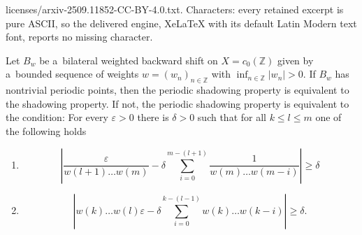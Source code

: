 \documentclass[10pt,a4paper]{amsart}
\newcommand{\Z}{\mathbb{Z}}
\newcommand{\abs}[1]{\left| #1 \right|}
\newcommand{\eps}{\varepsilon}
\begin{document}
licenses/arxiv-2509.11852-CC-BY-4.0.txt. Characters: every retained excerpt is pure ASCII, so the delivered engine, XeLaTeX with its default Latin Modern text font, reports no missing character.
	\begin{theorem} \label{thm:PSPc0}
		Let $B_w$ be a~bilateral weighted backward shift on \(X = c_0(\Z)\) given by a~bounded sequence of weights \(w = (w_n)_{n \in \Z}\) with \(\inf_{n \in \Z}\abs{w_n} > 0\). If $B_w$ has nontrivial periodic points, then the periodic shadowing property is equivalent to the shadowing property. If not, the periodic shadowing property is equivalent to the condition:
		For every $\eps > 0$ there is $\delta > 0$ such that for all $k \leq l \leq m$ one of the following holds
		\begin{enumerate}
			\item[(a)] \begin{equation*}
				\abs{\frac{\varepsilon}{w(l+1)\dots w(m)}- \delta \sum_{i=0}^{m-(l+1)}\frac{1}{w(m) \dots w(m-i)}} \geq \delta
			\end{equation*}
			\item[(b)] \begin{equation*}
				\abs{w(k) \dots w(l)\varepsilon -\delta\sum_{i=0}^{k-(l-1)}w(k) \dots w(k-i)} \geq \delta.
			\end{equation*}
		\end{enumerate}
	\end{theorem}
\end{document}
